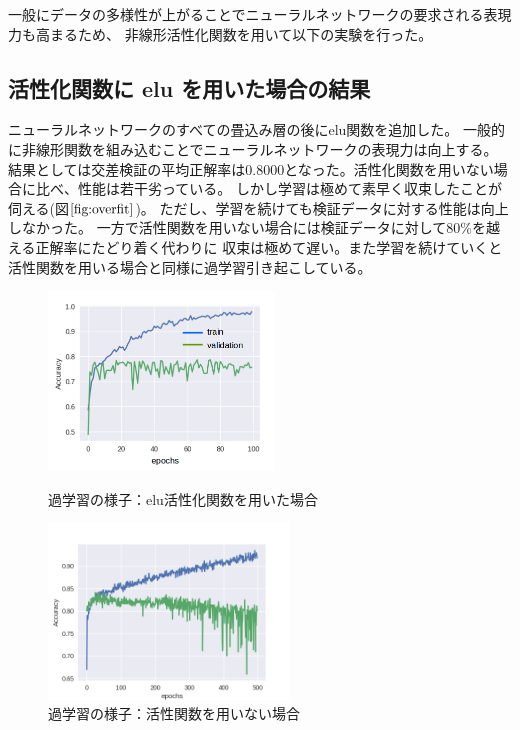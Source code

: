 一般にデータの多様性が上がることでニューラルネットワークの要求される表現力も高まるため、
非線形活性化関数を用いて以下の実験を行った。

\subsection{\mc 活性化関数に \rm elu \mc を用いた場合の結果}
ニューラルネットワークのすべての畳込み層の後にelu関数を追加した。
一般的に非線形関数を組み込むことでニューラルネットワークの表現力は向上する。
結果としては交差検証の平均正解率は0.8000となった。活性化関数を用いない場合に比べ、性能は若干劣っている。
しかし学習は極めて素早く収束したことが伺える(図\(\ref{fig:overfit}\))。
ただし、学習を続けても検証データに対する性能は向上しなかった。
一方で活性関数を用いない場合には検証データに対して80\%を越える正解率にたどり着く代わりに
収束は極めて遅い。また学習を続けていくと活性関数を用いる場合と同様に過学習引き起こしている。

\begin{figure}[t]
    \begin{minipage}{0.5\hsize}
        \centering
        \includegraphics[width=6cm]{images/overfitting.png}
        \caption{過学習の様子：elu活性化関数を用いた場合}
        \label{fig:overfit}
    \end{minipage}
    \begin{minipage}{0.5\hsize}
        \centering
        \includegraphics[width=6.4cm]{images/linearof.png}
        \caption{過学習の様子：活性関数を用いない場合}
        \label{fig:overfit}
    \end{minipage}
\end{figure}

